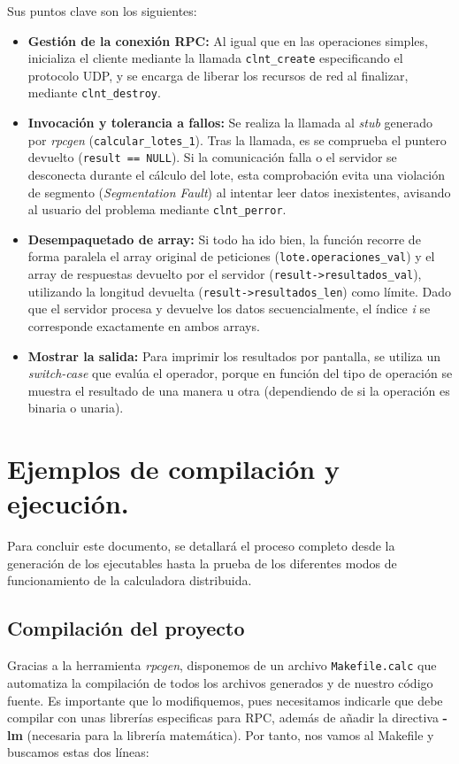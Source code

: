 \documentclass[a4paper,12pt]{article}
\begin{document}
		Sus puntos clave son los siguientes:
		\begin{itemize}
			\item \textbf{Gestión de la conexión RPC:} Al igual que en las operaciones simples, inicializa el cliente mediante la llamada \texttt{clnt\_create} especificando el protocolo UDP, y se encarga de liberar los recursos de red al finalizar, mediante \texttt{clnt\_destroy}.
			
			\item \textbf{Invocación y tolerancia a fallos:} Se realiza la llamada al \textit{stub} generado por \textit{rpcgen} (\texttt{calcular\_lotes\_1}). Tras la llamada, es se comprueba el puntero devuelto (\texttt{result == NULL}). Si la comunicación falla o el servidor se desconecta durante el cálculo del lote, esta comprobación evita una violación de segmento (\textit{Segmentation Fault}) al intentar leer datos inexistentes, avisando al usuario del problema mediante \texttt{clnt\_perror}.
			
			\item \textbf{Desempaquetado de array:} Si todo ha ido bien, la función recorre de forma paralela el array original de peticiones (\texttt{lote.operaciones\_val}) y el array de respuestas devuelto por el servidor (\texttt{result->resultados\_val}), utilizando la longitud devuelta (\texttt{result->resultados\_len}) como límite. Dado que el servidor procesa y devuelve los datos secuencialmente, el índice \textit{i} se corresponde exactamente en ambos arrays.
			
			\item \textbf{Mostrar la salida:} Para imprimir los resultados por pantalla, se utiliza un \textit{switch-case} que evalúa el operador, porque en función del tipo de operación se muestra el resultado de una manera u otra (dependiendo de si la operación es binaria o unaria).
		\end{itemize}
		
\section{Ejemplos de compilación y ejecución.}
	Para concluir este documento, se detallará el proceso completo desde la generación de los ejecutables hasta la prueba de los diferentes modos de funcionamiento de la calculadora distribuida.
	
	\subsection{Compilación del proyecto}
		Gracias a la herramienta \textit{rpcgen}, disponemos de un archivo \texttt{Makefile.calc} que automatiza la compilación de todos los archivos generados y de nuestro código fuente. Es importante que lo modifiquemos, pues necesitamos indicarle que debe compilar con unas librerías especificas para RPC, además de añadir la directiva \textbf{-lm} (necesaria para la librería matemática). Por tanto, nos vamos al Makefile y buscamos estas dos líneas:
		
\end{document}
